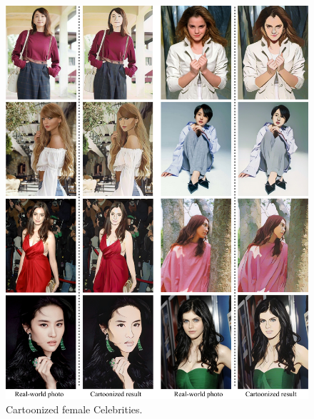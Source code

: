 \documentclass[10pt,twocolumn,letterpaper]{article}
\begin{document}
\begin{figure}[b]
\vspace{-0.5em}
\centering
\includegraphics[width=\linewidth]{figures/person2.pdf}
\caption{Cartoonized female Celebrities.}
\label{fig:person2}
\vspace{-0.5em}
\end{figure}
\end{document}

